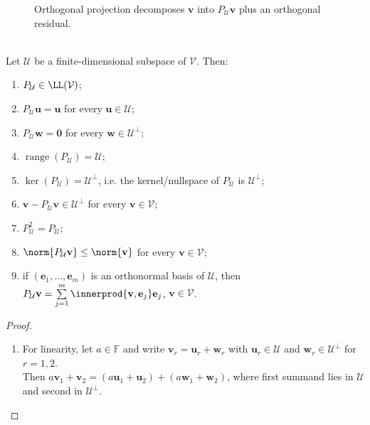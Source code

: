 \begin{figure}[H]
  \centering
  
  \caption{Orthogonal projection decomposes $\mathbf{v}$ into $P_{\mathcal{U}}\mathbf{v}$ plus an orthogonal residual.}
  \label{fig:orthogonal-projection-subspace}
\end{figure}

\begin{proposition} \label{prop:orthogonal-projection-properties} \\
Let $\mathcal{U}$ be a finite-dimensional subspace of $\mathcal{V}$. Then:
\begin{enumerate}[label=\roman*.]
\setlength{\itemsep}{0pt}
\item $P_{\mathcal{U}}\in\LL(\mathcal{V})$;
\item $P_{\mathcal{U}}\mathbf{u}=\mathbf{u}$ for every $\mathbf{u}\in\mathcal{U}$;
\item $P_{\mathcal{U}}\mathbf{w}=\mathbf{0}$ for every $\mathbf{w}\in\mathcal{U}^{\perp}$;
\item $\operatorname{range}(P_{\mathcal{U}})=\mathcal{U}$;
\item $\ker(P_{\mathcal{U}})=\mathcal{U}^{\perp}$, i.e. the kernel/nullspace of $P_{\mathcal{U}}$ is $\mathcal{U}^{\perp}$;
\item $\mathbf{v}-P_{\mathcal{U}}\mathbf{v}\in\mathcal{U}^{\perp}$ for every $\mathbf{v}\in\mathcal{V}$;
\item $P_{\mathcal{U}}^2=P_{\mathcal{U}}$;
\item $\norm{P_{\mathcal{U}}\mathbf{v}}\leq\norm{\mathbf{v}}$ for every $\mathbf{v}\in\mathcal{V}$;
\item if $(\mathbf{e}_1,\ldots,\mathbf{e}_m)$ is an orthonormal basis of $\mathcal{U}$, then $P_{\mathcal{U}}\mathbf{v}=\sum\limits_{j=1}^{m}\innerprod{\mathbf{v},\mathbf{e}_j}\mathbf{e}_j$, $\mathbf{v}\in\mathcal{V}$.
\end{enumerate}
\begin{proof}
\begin{enumerate}[label=(\roman*)]
\setlength{\itemsep}{0pt}
\item For linearity, let $a\in\mathbb{F}$ and write $\mathbf{v}_r=\mathbf{u}_r+\mathbf{w}_r$ with $\mathbf{u}_r\in\mathcal{U}$ and $\mathbf{w}_r\in\mathcal{U}^{\perp}$ for $r=1,2$.\\
Then $a\mathbf{v}_1+\mathbf{v}_2=(a\mathbf{u}_1+\mathbf{u}_2)+(a\mathbf{w}_1+\mathbf{w}_2)$, where first summand lies in $\mathcal{U}$ and second in $\mathcal{U}^{\perp}$.\\

\end{enumerate}
\end{proof}
\end{proposition}
